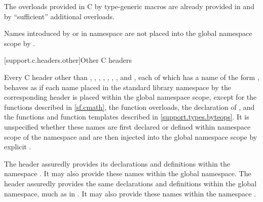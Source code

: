 \pnum
\begin{note}
The overloads provided in C by type-generic macros
are already provided in  and 
by ``sufficient'' additional overloads.
\end{note}

\pnum
\begin{note}
Names introduced by  or 
in namespace 
are not placed into the global namespace scope by .
\end{note}

[support.c.headers.other]{Other C headers}

\pnum
Every C header
other than
,
,
,\newline
{},
,
,
, and\newline
{},
each of
which has a name of the form
%
,
behaves as if each name placed in the standard library namespace by
the corresponding
header is placed within
the global namespace scope,
except for the functions described in \ref{sf.cmath},
the  function overloads,
the declaration of , and
the functions and function templates described in \ref{support.types.byteops}.
It is unspecified whether these names are first declared or defined within
namespace scope of the namespace
 and are then injected into the global namespace scope by
explicit .

\pnum
\begin{example}
The header  assuredly
provides its declarations and definitions within the namespace
. It may also provide these names within the
global namespace.
The header 
assuredly provides the same declarations and definitions within
the global namespace,
much as in \IsoCUndated{}. It may also provide these names within
the namespace .
\end{example}
